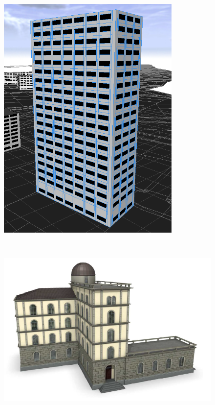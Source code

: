 \begin{figure}
\centering
\begin{minipage}{.48\textwidth}
  \centering
  \includegraphics[width=.5\linewidth]{images/Theory/Shape_Grammars/Edificio.png}
  \label{fig:SGBuilding}
\end{minipage}
~~
\begin{minipage}{.48\textwidth}
  \centering
  \includegraphics[width=0.8\linewidth]{images/Theory/Shape_Grammars/Capturar.png}
  \label{fig:CEBuilding}
\end{minipage}
\end{figure}

